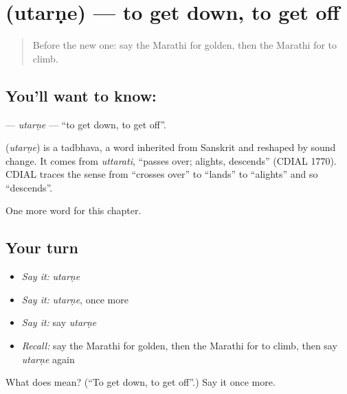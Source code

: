 \section[\texorpdfstring{\mr{उतरणे} (utarṇe)}{उतरणे (utarṇe)}]{ (utarṇe) — to get down, to get off}

\label{lesson:MR-C153-utarne}



\begin{quote}
Before the new one: say the Marathi for golden, then the Marathi for to climb.
\end{quote}

\subsection*{You'll want to know: }
\textbf{} — \emph{utarṇe} — \textquotedblleft{}to get down, to get off\textquotedblright{}.

\begin{cousinweb}
\textbf{} (\emph{utarṇe}) is a tadbhava, a word inherited from Sanskrit and reshaped by sound change. It comes from \emph{uttarati}, \textquotedblleft{}passes over; alights, descends\textquotedblright{} (CDIAL 1770). CDIAL traces the sense from \textquotedblleft{}crosses over\textquotedblright{} to \textquotedblleft{}lands\textquotedblright{} to \textquotedblleft{}alights\textquotedblright{} and so \textquotedblleft{}descends\textquotedblright{}.
\end{cousinweb}

\begin{grammarlens}[title={What you've built}]
One more word for this chapter.
\end{grammarlens}

\subsection*{Your turn}
\begin{itemize}
\raggedright
  \item \emph{Say it:} \emph{utarṇe}
  \item \emph{Say it:} \emph{utarṇe}, once more
  \item \emph{Say it:} say \emph{utarṇe}
  \item \emph{Recall:} say the Marathi for golden, then the Marathi for to climb, then say \emph{utarṇe} again
\end{itemize}

\begin{tcolorbox}[breakable,colback=teal!4,colframe=teal!35!black,title={Before you move on}]
What does  mean? (\textquotedblleft{}To get down, to get off\textquotedblright{}.) Say it once more.
\end{tcolorbox}
